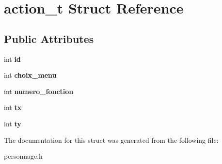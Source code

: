 \hypertarget{structaction__t}{}\section{action\+\_\+t Struct Reference}
\label{structaction__t}
\subsection*{Public Attributes}
\begin{DoxyCompactItemize}
\item 
\mbox{\label{structaction__t_ad9556abceaadb0792089912b7ae4d90b}} 
int {\bfseries id}
\item 
\mbox{\label{structaction__t_af59c941a3126efbeca39d8d5c19b7f14}} 
int {\bfseries choix\+\_\+menu}
\item 
\mbox{\label{structaction__t_ad3df49c95161be7f468844b7fb1f5023}} 
int {\bfseries numero\+\_\+fonction}
\item 
\mbox{\label{structaction__t_ad387b19bbf9f725886945f4c5a608a87}} 
int {\bfseries tx}
\item 
\mbox{\label{structaction__t_ae76721315880be3b894e75878d1e77ab}} 
int {\bfseries ty}
\end{DoxyCompactItemize}


The documentation for this struct was generated from the following file\+:\begin{DoxyCompactItemize}
\item 
personnage.\+h\end{DoxyCompactItemize}
